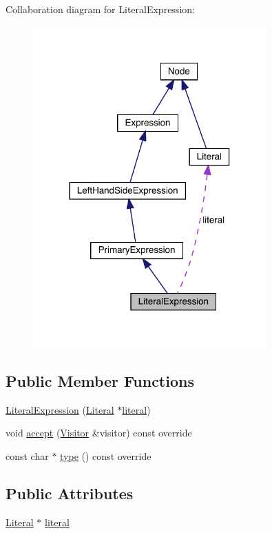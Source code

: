 Collaboration diagram for Literal\+Expression\+:
\nopagebreak
\begin{figure}[H]
\begin{center}
\leavevmode
\includegraphics[width=254pt]{struct_literal_expression__coll__graph}
\end{center}
\end{figure}
\subsection*{Public Member Functions}
\begin{DoxyCompactItemize}
\item 
\hyperlink{struct_literal_expression_a1675f7d7132e9b5944fa6f94789e8847}{Literal\+Expression} (\hyperlink{struct_literal}{Literal} $\ast$\hyperlink{struct_literal_expression_a9d2347f8e6e56bd6e43f12954db93926}{literal})
\item 
void \hyperlink{struct_literal_expression_a803968c0fd7ae048314c7812d992d995}{accept} (\hyperlink{struct_visitor}{Visitor} \&visitor) const override
\item 
const char $\ast$ \hyperlink{struct_literal_expression_a2c02bac28c4d9422580a1defa0b7506c}{type} () const override
\end{DoxyCompactItemize}
\subsection*{Public Attributes}
\begin{DoxyCompactItemize}
\item 
\hyperlink{struct_literal}{Literal} $\ast$ \hyperlink{struct_literal_expression_a9d2347f8e6e56bd6e43f12954db93926}{literal}
\end{DoxyCompactItemize}


